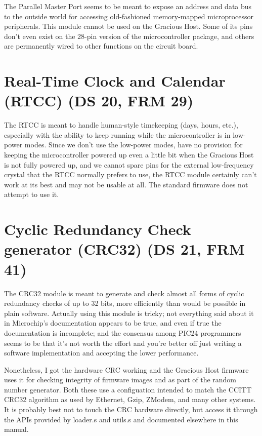 The Parallel Master Port seems to be meant to expose an address and data bus
to the outside world for accessing old-fashioned memory-mapped
microprocessor peripherals.  This module cannot be used on the Gracious
Host.  Some of its pins don't even exist on the 28-pin version of the
microcontroller package, and others are permanently wired to other functions
on the circuit board.


\section{Real-Time Clock and Calendar (RTCC) (DS 20, FRM 29)}

The RTCC is meant to handle human-style timekeeping (days, hours, etc.),
especially with the ability to keep running while the microcontroller is in
low-power modes.  Since we don't use the low-power modes, have no provision
for keeping the microcontroller powered up even a little bit when the
Gracious Host is not fully powered up, and we cannot spare pins for the
external low-frequency crystal that the RTCC normally prefers to use, the
RTCC module certainly can't work at its best and may not be usable at all. 
The standard firmware does not attempt to use it.


\section{Cyclic Redundancy Check generator (CRC32) (DS 21, FRM 41)}

The CRC32 module is meant to generate and check almost all forms of cyclic
redundancy checks of up to 32 bits, more efficiently than would be possible
in plain software.  Actually using this module is tricky; not everything
said about it in Microchip's documentation appears to be true, and even if
true the documentation is incomplete; and the consensus among PIC24
programmers seems to be that it's not worth the effort and you're better off
just writing a software implementation and accepting the lower performance. 

Nonetheless, I got the hardware CRC working and the Gracious Host
firmware uses it for checking integrity of firmware images and as part of
the random number generator.  Both these use a configuation intended to
match the CCITT CRC32 algorithm as used by Ethernet, Gzip, ZModem, and many
other systems.  It is probably best not to touch the CRC hardware directly,
but access it through the APIs provided by loader.s and utils.s and
documented elsewhere in this manual.

